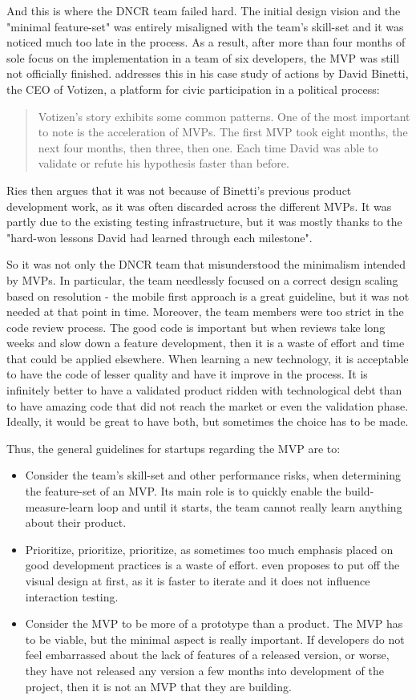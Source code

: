 \documentclass{article}
\begin{document}
And this is where the DNCR team failed hard. The initial design vision and the "minimal feature-set" was entirely misaligned with the team's skill-set and it was noticed much too late in the process. As a result, after more than four months of sole focus on the implementation in a team of six developers, the MVP was still not officially finished. \citet[159]{ries2011lean} addresses this in his case study of actions by David Binetti, the CEO of Votizen, a platform for civic participation in a political process:
\begin{quote}
Votizen's story exhibits some common patterns. One of the most important to note is the acceleration of MVPs. The first MVP took eight months, the next four months, then three, then one. Each time David was able to validate or refute his hypothesis faster than before. 
\end{quote}
Ries then argues that it was not because of Binetti's previous product development work, as it was often discarded across the different MVPs. It was partly due to the existing testing infrastructure, but it was mostly thanks to the "hard-won lessons David had learned through each milestone".

So it was not only the DNCR team that misunderstood the minimalism intended by MVPs. In particular, the team needlessly focused on a correct design scaling based on resolution - the mobile first approach is a great guideline, but it was not needed at that point in time. Moreover, the team members were too strict in the code review process. The good code is important but when reviews take long weeks and slow down a feature development, then it is a waste of effort and time that could be applied elsewhere. When learning a new technology, it is acceptable to have the code of lesser quality and have it improve in the process. It is infinitely better to have a validated product ridden with technological debt than to have amazing code that did not reach the market or even the validation phase. Ideally, it would be great to have both, but sometimes the choice has to be made.

Thus, the general guidelines for startups regarding the MVP are to:
\begin{itemize}
\item Consider the team's skill-set and other performance risks, when determining the feature-set of an MVP. Its main role is to quickly enable the build-measure-learn loop and until it starts, the team cannot really learn anything about their product.
\item Prioritize, prioritize, prioritize, as sometimes too much emphasis placed on good development practices is a waste of effort. \cite{klein2013ux} even proposes to put off the visual design at first, as it is faster to iterate and it does not influence interaction testing.
\item Consider the MVP to be more of a prototype than a product. The MVP has to be viable, but the minimal aspect is really important. If developers do not feel embarrassed about the lack of features of a released version, or worse, they have not released any version a few months into development of the project, then it is not an MVP that they are building.
\end{itemize}
\end{document}
